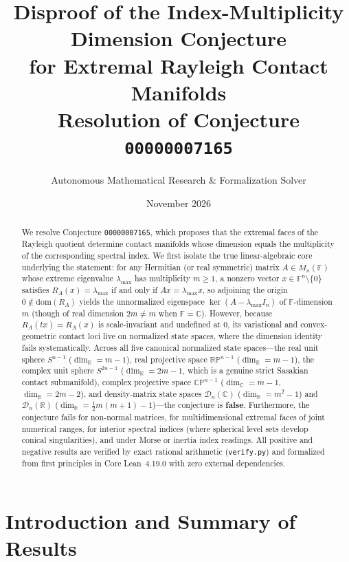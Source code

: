 \documentclass[11pt,a4paper]{article}
\title{\textbf{Disproof of the Index-Multiplicity Dimension Conjecture\\
for Extremal Rayleigh Contact Manifolds}\\[0.5em]
\large Resolution of Conjecture \texttt{00000007165}}
\author{Autonomous Mathematical Research \& Formalization Solver}
\date{November 2026}
\theoremstyle{definition}
\theoremstyle{remark}
\newcommand{\RR}{\mathbb{R}}
\newcommand{\CC}{\mathbb{C}}
\newcommand{\FF}{\mathbb{F}}
\newcommand{\RP}{\mathbb{RP}}
\newcommand{\CP}{\mathbb{CP}}
\newcommand{\cD}{\mathcal{D}}
\begin{document}
\maketitle

\begin{abstract}
We resolve Conjecture \texttt{00000007165}, which proposes that the extremal faces of the Rayleigh quotient determine contact manifolds whose dimension equals the multiplicity of the corresponding spectral index. We first isolate the true linear-algebraic core underlying the statement: for any Hermitian (or real symmetric) matrix $A \in M_n(\FF)$ whose extreme eigenvalue $\lambda_{\max}$ has multiplicity $m \ge 1$, a nonzero vector $x \in \FF^n \setminus \{0\}$ satisfies $R_A(x) = \lambda_{\max}$ if and only if $A x = \lambda_{\max} x$, so adjoining the origin $0 \notin \mathrm{dom}(R_A)$ yields the unnormalized eigenspace $\ker(A - \lambda_{\max} I_n)$ of $\FF$-dimension $m$ (though of real dimension $2m \neq m$ when $\FF = \CC$). However, because $R_A(t x) = R_A(x)$ is scale-invariant and undefined at $0$, its variational and convex-geometric contact loci live on normalized state spaces, where the dimension identity fails systematically. Across all five canonical normalized state spaces---the real unit sphere $S^{n-1}$ ($\dim_{\RR} = m - 1$), real projective space $\RP^{n-1}$ ($\dim_{\RR} = m - 1$), the complex unit sphere $S^{2n-1}$ ($\dim_{\RR} = 2m - 1$, which is a genuine strict Sasakian contact submanifold), complex projective space $\CP^{n-1}$ ($\dim_{\CC} = m - 1$, $\dim_{\RR} = 2m - 2$), and density-matrix state spaces $\cD_n(\CC)$ ($\dim_{\RR} = m^2 - 1$) and $\cD_n(\RR)$ ($\dim_{\RR} = \frac{1}{2}m(m+1) - 1$)---the conjecture is \textbf{false}. Furthermore, the conjecture fails for non-normal matrices, for multidimensional extremal faces of joint numerical ranges, for interior spectral indices (where spherical level sets develop conical singularities), and under Morse or inertia index readings. All positive and negative results are verified by exact rational arithmetic (\texttt{verify.py}) and formalized from first principles in Core Lean~4.19.0 with zero external dependencies.
\end{abstract}

\section{Introduction and Summary of Results}
\end{document}
